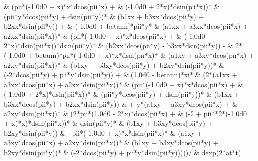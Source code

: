 \begin{fortrancode}[caption={Termos fontes}, label={cod:fortran-diffeq_2}]
     &     (pii*(-1.0d0 + x)*x*dcos(pii*x) + 
     &       (-1.0d0 + 2*x)*dsin(pii*x))*
     &     (pii*y*dcos(pii*y) + dsin(pii*y))*
     &     (b1xx + b3xx*dcos(pii*y) + b2xx*dsin(pii*y)) + 
     &    (-1.0d0 + betann)*pii*y*
     &     (a1xx + a3xx*dcos(pii*x) + a2xx*dsin(pii*x))*
     &     (pii*(-1.0d0 + x)*x*dcos(pii*x) + 
     &       (-1.0d0 + 2*x)*dsin(pii*x))*dsin(pii*y)*
     &     (b2xx*dcos(pii*y) - b3xx*dsin(pii*y)) - 
     &    2*(-1.0d0 + betann)*pii*(-1.0d0 + x)*x*dsin(pii*x)*
     &     (a1xy + a3xy*dcos(pii*x) + a2xy*dsin(pii*x))*
     &     (b1xy + b3xy*dcos(pii*y) + b2xy*dsin(pii*y))*
     &     (-2*dcos(pii*y) + pii*y*dsin(pii*y)) + 
     &    (1.0d0 - betann)*xi*
     &     (2*(a1xx + a3xx*dcos(pii*x) + a2xx*dsin(pii*x))*
     &        (pii*(-1.0d0 + x)*x*dcos(pii*x) + 
     &          (-1.0d0 + 2*x)*dsin(pii*x))*
     &        (pii*y*dcos(pii*y) + dsin(pii*y))*
     &        (b1xx + b3xx*dcos(pii*y) + b2xx*dsin(pii*y))
     &        + y*(a1xy + a3xy*dcos(pii*x) + 
     &          a2xy*dsin(pii*x))*
     &        (2*pii*(1.0d0 - 2*x)*dcos(pii*x) + 
     &          (-2 + pii**2*(-1.0d0 + x)*x)*dsin(pii*x))*
     &        dsin(pii*y)*
     &        (b1xy + b3xy*dcos(pii*y) + b2xy*dsin(pii*y))
     &        - pii*(-1.0d0 + x)*x*dsin(pii*x)*
     &        (a1xy + a3xy*dcos(pii*x) + a2xy*dsin(pii*x))*
     &        (b1xy + b3xy*dcos(pii*y) + b2xy*dsin(pii*y))*
     &        (-2*dcos(pii*y) + pii*y*dsin(pii*y)))))/
     &  dexp(2*at*t)
     

\end{fortrancode}

